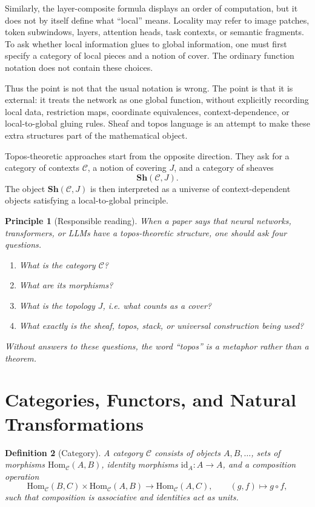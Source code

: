 \documentclass[11pt]{article}
\newtheorem{definition}{Definition}[section]
\newtheorem{principle}[definition]{Principle}
\newcommand{\Sh}{\mathbf{Sh}}
\newcommand{\Hom}{\mathrm{Hom}}
\newcommand{\id}{\mathrm{id}}
\begin{document}
Similarly, the layer-composite formula displays an order of computation, but it
does not by itself define what ``local'' means. Locality may refer to image
patches, token subwindows, layers, attention heads, task contexts, or semantic
fragments. To ask whether local information glues to global information, one
must first specify a category of local pieces and a notion of cover. The
ordinary function notation does not contain these choices.

Thus the point is not that the usual notation is wrong. The point is that it is
external: it treats the network as one global function, without explicitly
recording local data, restriction maps, coordinate equivalences,
context-dependence, or local-to-global gluing rules. Sheaf and topos language is
an attempt to make these extra structures part of the mathematical object.

Topos-theoretic approaches start from the opposite direction. They ask for a
category of contexts \(\mathcal C\), a notion of covering \(J\), and a category
of sheaves
\[
\Sh(\mathcal C,J).
\]
The object \(\Sh(\mathcal C,J)\) is then interpreted as a universe of
context-dependent objects satisfying a local-to-global principle.

\begin{principle}[Responsible reading]
When a paper says that neural networks, transformers, or LLMs have a
topos-theoretic structure, one should ask four questions.
\begin{enumerate}
\item What is the category \(\mathcal C\)?
\item What are its morphisms?
\item What is the topology \(J\), i.e. what counts as a cover?
\item What exactly is the sheaf, topos, stack, or universal construction being
used?
\end{enumerate}
Without answers to these questions, the word ``topos'' is a metaphor rather
than a theorem.
\end{principle}

\section{Categories, Functors, and Natural Transformations}

\begin{definition}[Category]
A category \(\mathcal C\) consists of objects \(A,B,\ldots\), sets of morphisms
\(\Hom_{\mathcal C}(A,B)\), identity morphisms \(\id_A:A\to A\), and a
composition operation
\[
\Hom_{\mathcal C}(B,C)\times \Hom_{\mathcal C}(A,B)
\longrightarrow
\Hom_{\mathcal C}(A,C),
\qquad
(g,f)\longmapsto g\circ f,
\]
such that composition is associative and identities act as units.
\end{definition}
\end{document}
